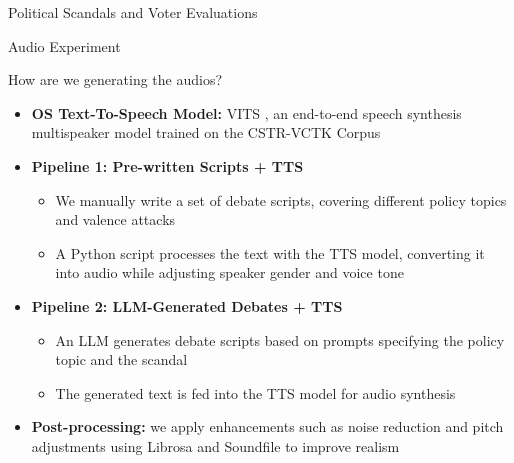 \documentclass[9pt, aspectratio=169]{beamer}
\newcommand{\customcite}[1]{\textcolor{blue}{\footnotesize\parencite{#1}}}
\begin{document}
\begin{section} {Political Scandals and Voter Evaluations}
\begin{subsection}{Audio Experiment}
\begin{frame}{How are we generating the audios?}
\begin{itemize}
\item \textbf{OS Text-To-Speech Model:} VITS \customcite{kim2021conditional}, an end-to-end speech synthesis multispeaker model trained on the CSTR-VCTK Corpus \customcite{Veaux2017CSTRVC}%
\vspace{0.3cm}
\item \textbf{Pipeline 1: Pre-written Scripts + TTS} \vspace{0.2cm}
\begin{itemize}
    \item We manually write a set of debate scripts, covering different policy topics and valence attacks \vspace{0.2cm}
    \item A Python script processes the text with the TTS model, converting it into audio while adjusting speaker gender and voice tone 
\end{itemize}
\vspace{0.3cm}
\item \textbf{Pipeline 2: LLM-Generated Debates + TTS} \vspace{0.2cm}
\begin{itemize}
    \item An LLM generates debate scripts based on prompts specifying the policy topic and the scandal \vspace{0.2cm}
    \item The generated text is fed into the TTS model for audio synthesis
\end{itemize}
\vspace{0.3cm}
\item \textbf{Post-processing:} we apply enhancements such as noise reduction and pitch adjustments using Librosa and Soundfile to improve realism
\end{itemize}
\end{frame}


\end{subsection}
\end{section}
\end{document}
